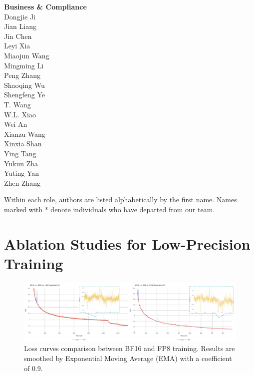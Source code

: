 \documentclass[11pt, a4paper, logo, copyright, nonumbering]{deepseek}
\begin{document}
\begin{CJK*}{UTF8}{gbsn}
\begin{multicols}{2}
\noindent
\textbf{\color{damaired} Business \& Compliance} \\
\color{damaired} Dongjie Ji \\
\color{damaired} Jian Liang \\
\color{damaired} Jin Chen \\
\color{damaired} Leyi Xia \\
\color{damaired} Miaojun Wang \\
\color{damaired} Mingming Li \\
\color{damaired} Peng Zhang \\
\color{damaired} Shaoqing Wu \\
\color{damaired} Shengfeng Ye \\
\color{damaired} T. Wang \\
\color{damaired} W.L. Xiao \\
\color{damaired} Wei An \\
\color{damaired} Xianzu Wang \\
\color{damaired} Xinxia Shan \\
\color{damaired} Ying Tang \\
\color{damaired} Yukun Zha \\
\color{damaired} Yuting Yan \\
\color{damaired} Zhen Zhang \\

\end{multicols} %

Within each role, authors are listed alphabetically by the first name. 
Names marked with * denote individuals who have departed from our team. 

\section{Ablation Studies for Low-Precision Training}
\label{app:fp8}

\begin{figure}[!h]
\centering
\includegraphics[width=0.95\linewidth]{figures/fp8-v.s.-bf16.pdf}
\caption{
    Loss curves comparison between BF16 and FP8 training. 
    Results are smoothed by Exponential Moving Average (EMA) with a coefficient of 0.9.
}
\label{fig:fp8_vs_bf16}
\end{figure}


\end{CJK*}
\end{document}
